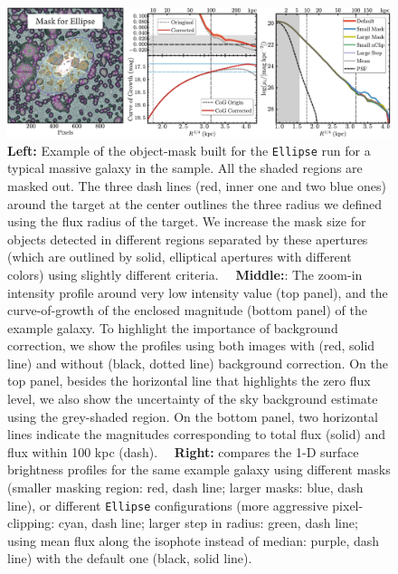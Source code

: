\documentclass[a4paper,fleqn,usenatbib]{mnras}
\begin{document}
    
    \begin{figure}
        \centering 
        \includegraphics[width=\textwidth]{fig/redbcg_ellipse_tech}
        \caption{
            \textbf{Left:} Example of the object-mask built for the \texttt{Ellipse}
            run for a typical massive galaxy in the sample. 
            All the shaded regions are masked out. 
            The three dash lines (red, inner one and two blue ones) around the target 
            at the center outlines the three radius we defined using the flux radius 
            of the target.  
            We increase the mask size for objects detected in different regions 
            separated by these apertures (which are outlined by solid, elliptical 
            apertures with different colors) using slightly different criteria.~~
            \textbf{Middle:}: The zoom-in intensity profile around very low intensity 
            value (top panel), and the curve-of-growth of the enclosed magnitude 
            (bottom panel) of the example galaxy.  
            To highlight the importance of background correction, we show the profiles 
            using both images with (red, solid line) and without (black, dotted line) 
            background correction. 
            On the top panel, besides the horizontal line that highlights the zero flux 
            level, we also show the uncertainty of the sky background estimate using 
            the grey-shaded region.  
            On the bottom panel, two horizontal lines indicate the magnitudes 
            corresponding to total flux (solid) and flux within 100 kpc (dash).~~
            \textbf{Right:} compares the 1-D surface brightness profiles for the same 
            example galaxy using different masks 
            (smaller masking region: red, dash line; larger masks: blue, dash line), 
            or different \texttt{Ellipse} configurations
            (more aggressive pixel-clipping: cyan, dash line; 
             larger step in radius: green, dash line; 
             using mean flux along the isophote instead of median: purple, dash line)
            with the default one (black, solid line).
            }
        \label{fig:ell_tech}
    \end{figure}
\end{document}
